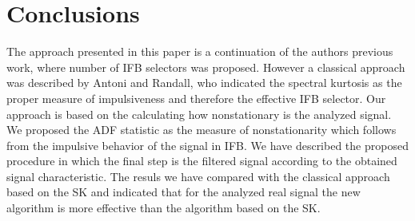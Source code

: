 \documentclass[11pt]{article}
\begin{document}
\section{Conclusions}
The approach presented in this paper is a continuation of the authors previous work, where number of IFB selectors was proposed. However a classical approach was described by Antoni and Randall, who indicated the spectral kurtosis as the proper measure of impulsiveness and therefore the effective IFB selector. Our approach is based on the calculating how nonstationary is the analyzed signal. We proposed the ADF statistic as the measure of nonstationarity which follows from the impulsive behavior of the signal in IFB. We have described the proposed procedure in which the final step is the filtered signal according to the obtained signal characteristic. The resuls we have compared with the classical approach based on the SK and indicated that for the analyzed real signal the new algorithm is more effective than the algorithm based on the SK.




\end{document}
